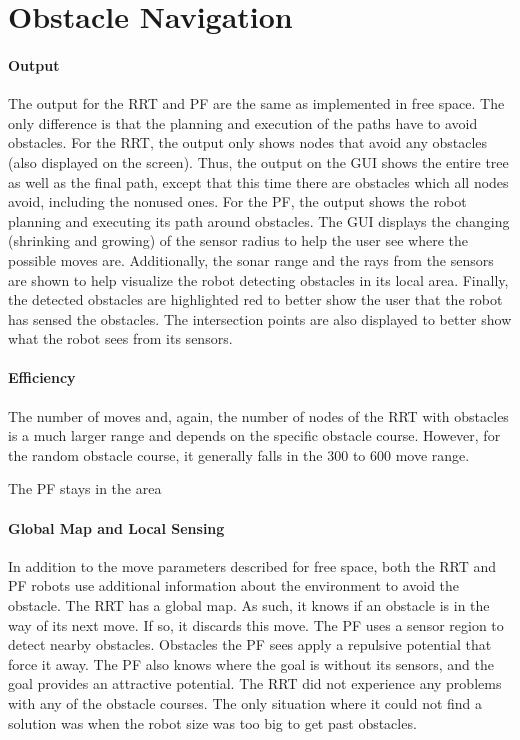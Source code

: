 \documentclass[12pt]{article}
\begin{document}
\section{Obstacle Navigation}
\paragraph*{Output}
The output for the RRT and PF are the same as implemented in free space. The only difference is that the planning and execution of the paths have to avoid obstacles. For the RRT, the output only shows nodes that avoid any obstacles (also displayed on the screen). Thus, the output on the GUI shows the entire tree as well as the final path, except that this time there are obstacles which all nodes avoid, including the nonused ones. For the PF, the output shows the robot planning and executing its path around obstacles. The GUI displays the changing (shrinking and growing) of the sensor radius to help the user see where the possible moves are. Additionally, the sonar range and the rays from the sensors are shown to help visualize the robot detecting obstacles in its local area. Finally, the detected obstacles are highlighted red to better show the user that the robot has sensed the obstacles. The intersection points are also displayed to better show what the robot sees from its sensors.

\paragraph*{Efficiency}
The number of moves and, again, the number of nodes of the RRT with obstacles is a much larger range and depends on the specific obstacle course. However, for the random obstacle course, it generally falls in the 300 to 600 move range.

The PF stays in the area
\paragraph*{Global Map and Local Sensing}
In addition to the move parameters described for free space, both the RRT and PF robots use additional information about the environment to avoid the obstacle. The RRT has a global map. As such, it knows if an obstacle is in the way of its next move. If so, it discards this move. The PF uses a sensor region to detect nearby obstacles. Obstacles the PF sees apply a repulsive potential that force it away. The PF also knows where the goal is without its sensors, and the goal provides an attractive potential. The RRT did not experience any problems with any of the obstacle courses. The only situation where it could not find a solution was when the robot size was too big to get past obstacles. 
\end{document}
